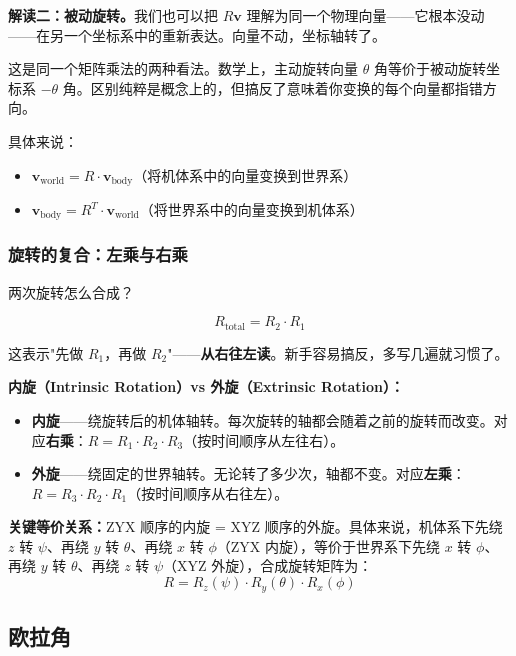 \textbf{解读二：被动旋转。}我们也可以把 $R\mathbf{v}$ 理解为同一个物理向量——它根本没动——在另一个坐标系中的重新表达。向量不动，坐标轴转了。

这是同一个矩阵乘法的两种看法。数学上，主动旋转向量 $\theta$ 角等价于被动旋转坐标系 $-\theta$ 角。区别纯粹是概念上的，但搞反了意味着你变换的每个向量都指错方向。

具体来说：
\begin{itemize}
    \item $\mathbf{v}_{\text{world}} = R \cdot \mathbf{v}_{\text{body}}$（将机体系中的向量变换到世界系）
    \item $\mathbf{v}_{\text{body}} = R^T \cdot \mathbf{v}_{\text{world}}$（将世界系中的向量变换到机体系）
\end{itemize}

\subsubsection{旋转的复合：左乘与右乘}

两次旋转怎么合成？

\begin{equation}
R_{\text{total}} = R_2 \cdot R_1
\end{equation}

这表示"先做 $R_1$，再做 $R_2$"——\textbf{从右往左读}。新手容易搞反，多写几遍就习惯了。

\textbf{内旋（Intrinsic Rotation）vs 外旋（Extrinsic Rotation）：}
\begin{itemize}
    \item \textbf{内旋}——绕旋转后的机体轴转。每次旋转的轴都会随着之前的旋转而改变。对应\textbf{右乘}：$R = R_1 \cdot R_2 \cdot R_3$（按时间顺序从左往右）。
    \item \textbf{外旋}——绕固定的世界轴转。无论转了多少次，轴都不变。对应\textbf{左乘}：$R = R_3 \cdot R_2 \cdot R_1$（按时间顺序从右往左）。
\end{itemize}

\textbf{关键等价关系：}ZYX 顺序的内旋 = XYZ 顺序的外旋。具体来说，机体系下先绕 $z$ 转 $\psi$、再绕 $y$ 转 $\theta$、再绕 $x$ 转 $\phi$（ZYX 内旋），等价于世界系下先绕 $x$ 转 $\phi$、再绕 $y$ 转 $\theta$、再绕 $z$ 转 $\psi$（XYZ 外旋），合成旋转矩阵为：
\begin{equation}
R = R_z(\psi) \cdot R_y(\theta) \cdot R_x(\phi)
\end{equation}

\subsection{欧拉角}

